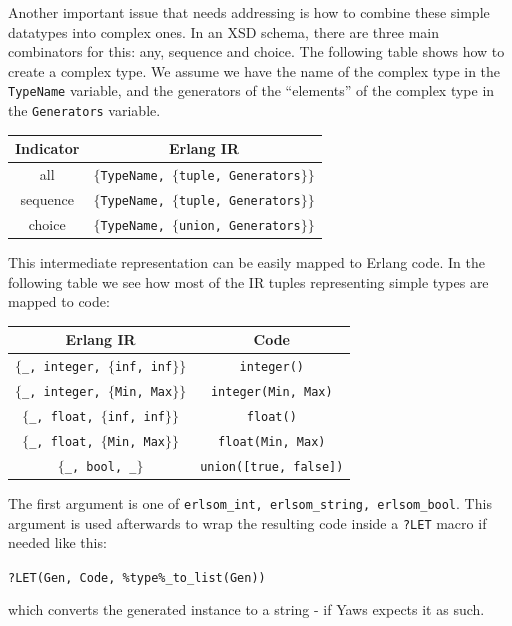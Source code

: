 \documentclass[submission,copyright]{eptcs}
\newcommand{\LET}{\texttt{?LET}\xspace}
\begin{document}
Another important issue that needs addressing is how to combine these simple
datatypes into complex ones. In an XSD schema, there are three main combinators for
this: any, sequence and choice. The following table shows how to create a
complex type. We assume we have the name of the complex type in the 
\texttt{TypeName} variable, and the generators of the ``elements'' of the complex
type in the \texttt{Generators} variable. 

\begin{center}\footnotesize
  \begin{tabular}{cc}
    \toprule
    Indicator & Erlang IR\\
    \midrule
    all & \texttt{$\{$TypeName, $\{$tuple, Generators$\}\}$}\\
    sequence & \texttt{$\{$TypeName, $\{$tuple, Generators$\}\}$}\\
    choice & \texttt{$\{$TypeName, $\{$union, Generators$\}\}$}\\
    \bottomrule
  \end{tabular}
\end{center}

This intermediate representation can be easily mapped to Erlang code. In the 
following table we see how most of the IR tuples representing simple types are
mapped to code:
\begin{center}\footnotesize
  \begin{tabular}{cc}
    \toprule
    Erlang IR & Code\\
    \midrule
    \texttt{$\{$\_, integer, $\{$inf, inf$\}\}$} & \texttt{integer()}\\
    \texttt{$\{$\_, integer, $\{$Min, Max$\}\}$} & \texttt{integer(Min, Max)}\\
    \texttt{$\{$\_, float, $\{$inf, inf$\}\}$} & \texttt{float()}\\
    \texttt{$\{$\_, float, $\{$Min, Max$\}\}$} & \texttt{float(Min, Max)}\\
    \texttt{$\{$\_, bool, \_$\}$} & \texttt{union([true, false])}\\
    \bottomrule
  \end{tabular}
\end{center}

The first argument is one of \texttt{erlsom\_int, erlsom\_string, erlsom\_bool}.
This argument is used afterwards to wrap the resulting code inside a \LET
macro if needed like this:

\begin{center}
  \texttt{?LET(Gen, Code, \%type\%\_to\_list(Gen))}
\end{center}
which converts the generated instance to a string - if Yaws expects it as such.
\end{document}
